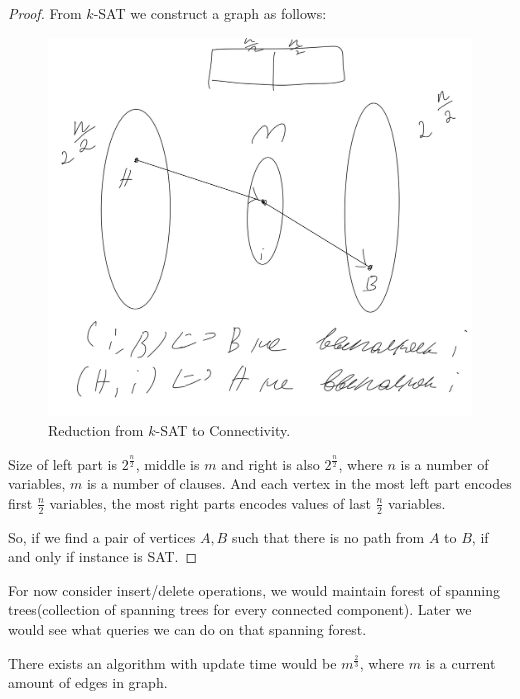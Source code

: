 \begin{proof}
  From $k$-SAT we construct a graph as follows:

\begin{figure}[H]
	\centering
	\includegraphics[width=0.5\linewidth]{figures/connectivity_seth_hard.jpeg}
	\caption{Reduction from $k$-SAT to Connectivity.}
	\label{fig:connectivity_seth_hard}
\end{figure}

  Size of left part is $2^{\frac{n}{2}}$, middle is $m$ and right is also $2^{\frac{n}{2}}$, where $n$ is a number of variables, $m$ is a number of clauses. And each vertex in the most left part encodes first $\frac{n}{2}$ variables, the most right parts encodes values of last $\frac{n}{2}$ variables.

  So, if we find a pair of vertices $A, B$ such that there is no path from $A$ to $B$, if and only if instance is SAT.
\end{proof}

For now consider insert/delete operations, we would maintain forest of spanning trees(collection of spanning trees for every connected component).
Later we would see what queries we can do on that spanning forest.

\begin{algorithm}[Freckerson?]
  There exists an algorithm with update time would be $m^{\frac{2}{3}}$, where $m$ is a current amount of edges in graph.
\end{algorithm}

